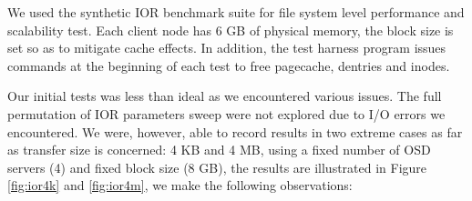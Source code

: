 We used the synthetic IOR benchmark
suite\cite{ior} for file system
level performance and scalability test.  
Each client node has 6 GB of physical memory, the block
size is set so as to mitigate cache effects. In addition, the test harness
program issues commands at the beginning of each test to free pagecache,
dentries and inodes.

Our initial tests was less than ideal as we encountered various issues.  The
full permutation of IOR parameters sweep were not explored due to I/O errors
we encountered.  We were, however, able to record results in two extreme cases
as far as transfer size is concerned: 4 KB and 4 MB, using a fixed number of
OSD servers (4) and fixed block size (8 GB), the results are illustrated in
Figure \ref{fig:ior4k} and \ref{fig:ior4m}, we make the following
observations:


